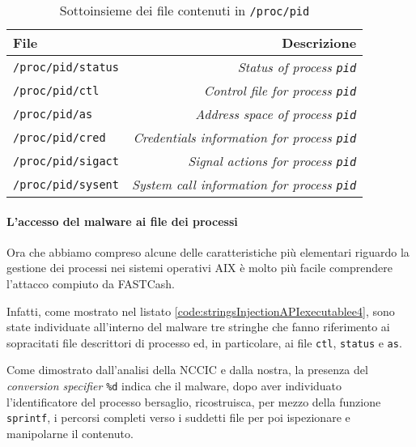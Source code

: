 \documentclass[10pt,a4paper, titlepage]{report}
\begin{document}
\begin{table}[h!]
 
    \caption{Sottoinsieme dei file contenuti in \texttt{/proc/pid} }
    \centering
    \label{tab:AIXProcessFiles}
    
    \begin{tabular}{l|r}
      \toprule
      File & Descrizione \\
      \midrule
      \texttt{/proc/pid/status} & \textit{Status of process \texttt{pid}} \\
      \hline
      \texttt{/proc/pid/ctl} & \textit{Control file for process \texttt{pid}} \\
       \hline
      \texttt{/proc/pid/as} & \textit{Address space of process \texttt{pid}} \\
       \hline
      \texttt{/proc/pid/cred} & \textit{Credentials information for process \texttt{pid}} \\
       \hline
      \texttt{/proc/pid/sigact} &\textit{Signal actions for process \texttt{pid}} \\
       \hline
      \texttt{/proc/pid/sysent} & \textit{System call information for process \texttt{pid}}\\
       
      \bottomrule
    \end{tabular}
\end{table}

\paragraph{L'accesso del malware ai file dei processi}

Ora che abbiamo compreso alcune delle caratteristiche più elementari riguardo la gestione dei processi nei sistemi operativi AIX è molto più facile comprendere l'attacco compiuto da FASTCash.

Infatti, come mostrato nel listato \ref{code:stringsInjectionAPIexecutablee4}, sono state individuate all'interno del malware tre stringhe che fanno riferimento ai sopracitati file descrittori di processo ed, in particolare, ai file \texttt{ctl}, \texttt{status} e \texttt{as}.

Come dimostrato dall'analisi della NCCIC e dalla nostra, la presenza del \textit{conversion specifier} \texttt{\%d} indica che il malware, dopo aver individuato l'identificatore del processo bersaglio, ricostruisca, per mezzo della funzione \texttt{sprintf}, i percorsi completi verso i suddetti file per poi ispezionare e manipolarne il contenuto. 
\end{document}
